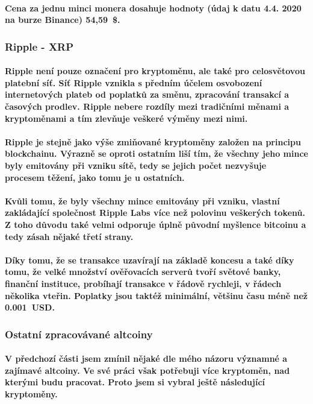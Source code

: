 \documentclass[thesis=B,czech]{FITthesis}[2019/03/21]
\begin{document}
\paragraph{
Cena za jednu minci monera dosahuje hodnoty (údaj k datu 4.4. 2020 na burze Binance) 54,59~\$. \cite{binance_markets}
}
\subsubsection{Ripple - XRP}
\paragraph{
Ripple není pouze označení pro kryptoměnu, ale také pro celosvětovou platební síť. Síť Ripple vznikla s předním účelem osvobození internetových plateb od poplatků za směnu, zpracování transakcí a časových prodlev. Ripple nebere rozdíly mezi tradičními měnami a kryptoměnami a tím zlevňuje veškeré výměny mezi nimi.
}
\paragraph{
Ripple je stejně jako výše zmiňované kryptoměny založen na principu blockchainu. Výrazně se oproti ostatním liší tím, že všechny jeho mince byly emitovány při vzniku sítě, tedy se jejich počet nezvyšuje procesem těžení, jako tomu je u ostatních.
}
\paragraph{
Kvůli tomu, že byly všechny mince emitovány při vzniku, vlastní zakládající společnost Ripple Labs více než polovinu veškerých tokenů. Z toho důvodu také velmi odporuje úplně původní myšlence bitcoinu a tedy zásah nějaké třetí strany. \cite{alza_ripple}
}
\paragraph{
Díky tomu, že se transakce uzavírají na základě koncesu a také díky tomu, že velké množství ověřovacích serverů tvoří světové banky, finanční instituce, probíhají transakce v řádově rychleji, v řádech několika vteřin. Poplatky jsou taktéž minimální, většinu času méně než 0.001~USD. \cite{bitinfocharts} \cite{coincodex_ripple}
}
\subsubsection{Ostatní zpracovávané altcoiny}
\paragraph{
V předchozí části jsem zmínil nějaké dle mého názoru významné a zajímavé altcoiny. Ve své práci však potřebuji více kryptoměn, nad kterými budu pracovat. Proto jsem si vybral ještě následující kryptoměny.
}
\end{document}
